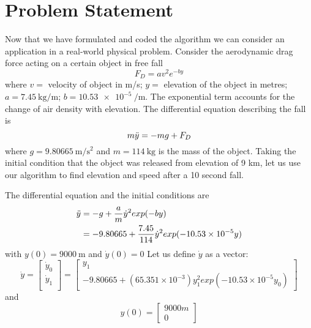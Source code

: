 \documentclass[12pt]{article}
\begin{document}
\section{Problem Statement}
Now that we have formulated and coded the algorithm we can consider an application in a real-world physical problem. Consider the aerodynamic drag force acting on a certain object in free fall
\begin{equation}
    F_D = a v^2 e^{-by}
\end{equation}
where $v =$ velocity of object in m/s; $y =$ elevation of the object in metres; $a = \SI{7.45}{\kilogram \per \metre}$; $b = \SI{10.53e-5}{\per \metre}$. The exponential term accounts for the change of air density with elevation. The differential equation describing the fall is
\begin{equation}
    m \Ddot{y} = -mg + F_D
\end{equation}
where $g = \SI{9.80665}{\metre \per \second \squared}$ and $m = \SI{114}{\kilogram}$ is the mass of the object. Taking the initial condition that the object was released from elevation of 9 km, let us use our algorithm to find elevation and speed after a 10 second fall.
\par
The differential equation and the initial conditions are
\begin{equation}
    \begin{split}
        \Ddot{y}
        &= -g + \dfrac{a}{m} \Dot{y}^2 exp(-by) \\
        &= -9.80665 + \dfrac{7.45}{114} \Dot{y}^2 exp(-10.53 \times 10^{-5} y)
    \end{split}
\end{equation}
with $y(0) = \SI{9000}{\metre}$ and $\Dot{y}(0) = 0$
Let us define $\Dot{y}$ as a vector:
\begin{equation}
    \Dot{y} = 
    \begin{bmatrix}
        \Dot{y}_0 \\
        \Dot{y}_1 \\
    \end{bmatrix}
    =
    \begin{bmatrix}
        y_1 \\
        -9.80665 + (65.351 \times 10^{-3})y_1^2 exp(-10.53 \times 10^{-5}y_0)
    \end{bmatrix}
\end{equation}
and
\begin{equation}
    y(0) = 
    \begin{bmatrix}
        9000 m \\
        0
    \end{bmatrix}
\end{equation}
\end{document}
